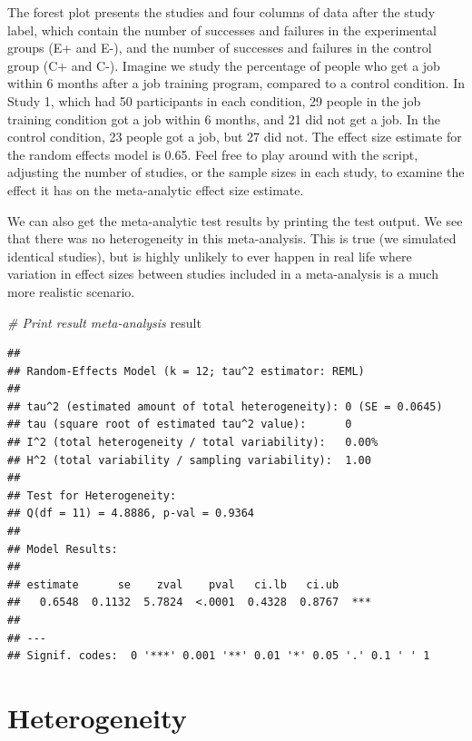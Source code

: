 \documentclass[
  oneside]{krantz}
\makeatletter
\newenvironment{Shaded}{\begin{snugshade}}{\end{snugshade}}
\newcommand{\CommentTok}[1]{\textcolor[rgb]{0.37,0.37,0.37}{\textit{#1}}}
\newcommand{\NormalTok}[1]{#1}
\newenvironment{kframe}{%
\medskip{}
\setlength{\fboxsep}{.8em}
 \def\at@end@of@kframe{}%
 \ifinner\ifhmode%
  \def\at@end@of@kframe{\end{minipage}}%
  \begin{minipage}{\columnwidth}%
 \fi\fi%
 \def\FrameCommand##1{\hskip\@totalleftmargin \hskip-\fboxsep
 \colorbox{shadecolor}{##1}\hskip-\fboxsep
     \hskip-\linewidth \hskip-\@totalleftmargin \hskip\columnwidth}%
 \MakeFramed {\advance\hsize-\width
   \@totalleftmargin\z@ \linewidth\hsize
   \@setminipage}}%
 {\par\unskip\endMakeFramed%
 \at@end@of@kframe}
\renewenvironment{Shaded}{\begin{kframe}}{\end{kframe}}
\makeatother
\begin{document}
The forest plot presents the studies and four columns of data after the study label, which contain the number of successes and failures in the experimental groups (E+ and E-), and the number of successes and failures in the control group (C+ and C-). Imagine we study the percentage of people who get a job within 6 months after a job training program, compared to a control condition. In Study 1, which had 50 participants in each condition, 29 people in the job training condition got a job within 6 months, and 21 did not get a job. In the control condition, 23 people got a job, but 27 did not. The effect size estimate for the random effects model is 0.65. Feel free to play around with the script, adjusting the number of studies, or the sample sizes in each study, to examine the effect it has on the meta-analytic effect size estimate.

We can also get the meta-analytic test results by printing the test output. We see that there was no heterogeneity in this meta-analysis. This is true (we simulated identical studies), but is highly unlikely to ever happen in real life where variation in effect sizes between studies included in a meta-analysis is a much more realistic scenario.

\begin{Shaded}
\begin{Highlighting}[]
\CommentTok{\# Print result meta{-}analysis}
\NormalTok{result}
\end{Highlighting}
\end{Shaded}

\begin{verbatim}
## 
## Random-Effects Model (k = 12; tau^2 estimator: REML)
## 
## tau^2 (estimated amount of total heterogeneity): 0 (SE = 0.0645)
## tau (square root of estimated tau^2 value):      0
## I^2 (total heterogeneity / total variability):   0.00%
## H^2 (total variability / sampling variability):  1.00
## 
## Test for Heterogeneity:
## Q(df = 11) = 4.8886, p-val = 0.9364
## 
## Model Results:
## 
## estimate      se    zval    pval   ci.lb   ci.ub     ​ 
##   0.6548  0.1132  5.7824  <.0001  0.4328  0.8767  *** 
## 
## ---
## Signif. codes:  0 '***' 0.001 '**' 0.01 '*' 0.05 '.' 0.1 ' ' 1
\end{verbatim}

\hypertarget{heterogeneity}{%
\section{Heterogeneity}\label{heterogeneity}}
\end{document}
